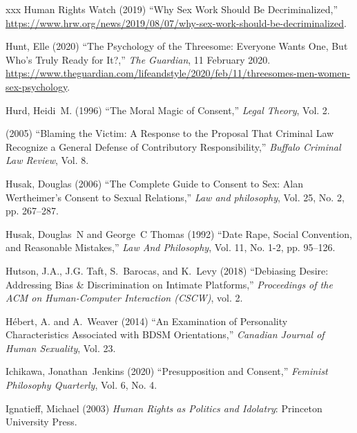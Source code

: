 \documentclass[]{jlreq} \usepackage{mystyle}
\begin{document}
\begin{thebibliography}{xxx}
{Human Rights Watch} (2019) ``Why Sex Work Should Be Decriminalized,''
  \url{https://www.hrw.org/news/2019/08/07/why-sex-work-should-be-decriminalized}.

Hunt, Elle (2020) ``The Psychology of the Threesome: Everyone Wants One, But
  Who's Truly Ready for It?,'' \emph{The Guardian}, 11 February 2020.
  \url{https://www.theguardian.com/lifeandstyle/2020/feb/11/threesomes-men-women-sex-psychology}.

Hurd, Heidi~M. (1996) ``The Moral Magic of Consent,'' \textit{ Legal Theory},
  Vol. 2.

 \bysame{}  (2005) ``Blaming the Victim: A Response to the Proposal That
  Criminal Law Recognize a General Defense of Contributory Responsibility,''
  \textit{ Buffalo Criminal Law Review}, Vol. 8.

Husak, Douglas (2006) ``The Complete Guide to Consent to Sex: Alan Wertheimer's
  Consent to Sexual Relations,'' \textit{ Law and philosophy}, Vol. 25, No. 2,
  pp. 267--287.

Husak, Douglas~N and George~C Thomas (1992) ``Date Rape, Social Convention, and
  Reasonable Mistakes,'' \textit{ Law And Philosophy}, Vol. 11, No. 1-2, pp.
  95--126.

Hutson, J.A., J.G. Taft, S.~Barocas, and K.~Levy (2018) ``Debiasing Desire:
  Addressing Bias \& Discrimination on Intimate Platforms,'' \emph{Proceedings
  of the ACM on Human-Computer Interaction (CSCW)}, vol. 2.

Hébert, A. and A.~Weaver (2014) ``An Examination of Personality
  Characteristics Associated with BDSM Orientations,'' \textit{ Canadian
  Journal of Human Sexuality}, Vol. 23.

Ichikawa, Jonathan~Jenkins (2020) ``Presupposition and Consent,'' \textit{
  Feminist Philosophy Quarterly}, Vol. 6, No. 4.

Ignatieff, Michael (2003)  \textit{ Human Rights as Politics and Idolatry}:
  Princeton University Press.


\end{thebibliography}
\end{document}
